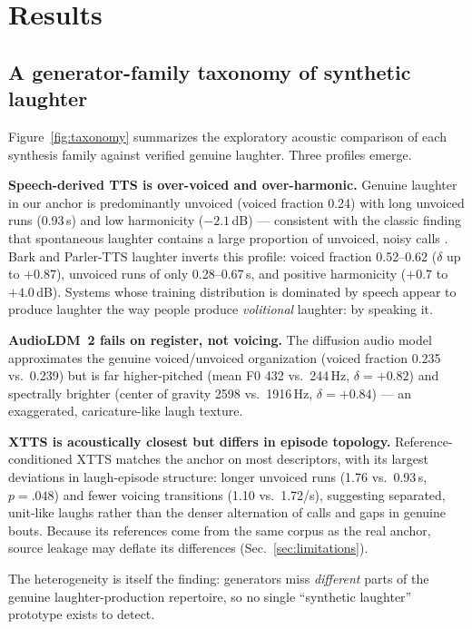 \documentclass[sigconf,anonymous,review]{acmart}
\begin{document}
\section{Results}

\subsection{A generator-family taxonomy of synthetic laughter}
\label{sec:taxonomy}
Figure~\ref{fig:taxonomy} summarizes the exploratory acoustic comparison of each synthesis family against verified genuine laughter. Three profiles emerge.

\textbf{Speech-derived TTS is over-voiced and over-harmonic.} Genuine laughter in our anchor is predominantly unvoiced (voiced fraction 0.24) with long unvoiced runs (0.93\,s) and low harmonicity ($-2.1$\,dB) --- consistent with the classic finding that spontaneous laughter contains a large proportion of unvoiced, noisy calls \cite{bachorowski2001acoustic,lavan2016laugh}. Bark and Parler-TTS laughter inverts this profile: voiced fraction 0.52--0.62 ($\delta$ up to $+0.87$), unvoiced runs of only 0.28--0.67\,s, and positive harmonicity ($+0.7$ to $+4.0$\,dB). Systems whose training distribution is dominated by speech appear to produce laughter the way people produce \emph{volitional} laughter: by speaking it.

\textbf{AudioLDM~2 fails on register, not voicing.} The diffusion audio model approximates the genuine voiced/unvoiced organization (voiced fraction 0.235 vs.\ 0.239) but is far higher-pitched (mean F0 432 vs.\ 244\,Hz, $\delta=+0.82$) and spectrally brighter (center of gravity 2598 vs.\ 1916\,Hz, $\delta=+0.84$) --- an exaggerated, caricature-like laugh texture.

\textbf{XTTS is acoustically closest but differs in episode topology.} Reference-conditioned XTTS matches the anchor on most descriptors, with its largest deviations in laugh-episode structure: longer unvoiced runs (1.76 vs.\ 0.93\,s, $p=.048$) and fewer voicing transitions (1.10 vs.\ 1.72/s), suggesting separated, unit-like laughs rather than the denser alternation of calls and gaps in genuine bouts. Because its references come from the same corpus as the real anchor, source leakage may deflate its differences (Sec.~\ref{sec:limitations}).

The heterogeneity is itself the finding: generators miss \emph{different} parts of the genuine laughter-production repertoire, so no single ``synthetic laughter'' prototype exists to detect.
\end{document}
